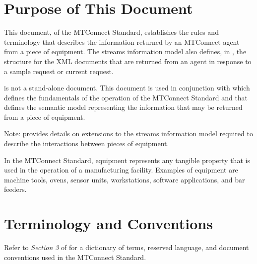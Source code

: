 \section{Purpose of This Document}

This document,  of the MTConnect  Standard, establishes the rules and terminology that describes the information returned by an MTConnect \gls{agent} from a piece of equipment.  The \gls{streams information model} also defines, in , the structure for the XML documents that are returned from an \gls{agent} in response to a \gls{sample request} or \gls{current request}.  

 is not a stand-alone document.   This document is used in conjunction with   which defines the fundamentals of the operation of the MTConnect Standard and  that defines the semantic model representing the information that may be returned from a piece of equipment.

\begin{note}
Note:  provides details on extensions to the \gls{streams information model} required to describe the interactions between pieces of equipment.
\end{note}

In the MTConnect Standard, equipment represents any tangible property that is used in the operation of a manufacturing facility.  Examples of equipment are machine tools, ovens, sensor units, workstations, software applications, and bar feeders.

\section{Terminology and Conventions}
Refer to \textit{Section 3} of  for a dictionary of terms, reserved language, and document conventions used in the MTConnect Standard.

\printglossary

\printacronyms  

\printbibliography[title=MTConnect References,keyword=MTC]

\printbibliography[title=Other References,notkeyword=MTC]